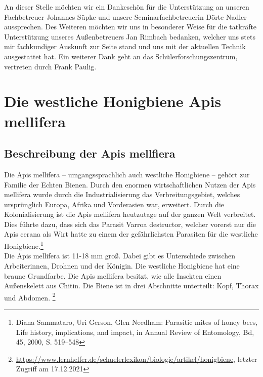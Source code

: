 \documentclass[11pt,a4paper]{article}
\begin{document}
An dieser Stelle möchten wir ein Dankeschön für die Unterstützung an unseren Fachbetreuer Johannes Süpke und unsere Seminarfachbetreuerin Dörte Nadler aussprechen. Des Weiteren möchten wir uns in besonderer Weise für die tatkräfte Unterstützung unseres Außenbetreuers Jan Rimbach bedanken, welcher uns stets mir fachkundiger Auskunft zur Seite stand und uns mit der aktuellen Technik ausgestattet hat. Ein weiterer Dank geht an das Schülerforschungszentrum, vertreten durch Frank Paulig. \\




\newpage
\section{Die westliche Honigbiene Apis mellifera} \label{section:Theory}

\subsection{Beschreibung der Apis mellfiera}
Die Apis mellifera – umgangssprachlich auch westliche Honigbiene – gehört zur Familie der Echten Bienen. Durch den enormen wirtschaftlichen Nutzen der Apis mellifera wurde durch die Industrialisierung das Verbreitungsgebiet, welches ursprünglich Europa, Afrika und Vorderasien war, erweitert. Durch die Kolonialisierung ist die Apis mellifera heutzutage auf der ganzen Welt verbreitet. Dies führte dazu, dass sich das Parasit Varroa destructor, welcher vorerst nur die Apis cerana als Wirt hatte zu einem der gefährlichsten Parasiten für die westliche Honigbiene.\footnote{Diana Sammataro, Uri Gerson, Glen Needham: Parasitic mites of honey bees, Life history, implications, and impact, in Annual Review of Entomology, Bd, 45, 2000, S. 519–548} \\
Die Apis mellifera ist 11-18 mm groß. Dabei gibt es Unterschiede zwischen Arbeiterinnen, Drohnen und der Königin. Die westliche Honigbiene hat eine braune Grundfarbe. Die Apis mellifera besitzt, wie alle Insekten einen Außenskelett aus Chitin. Die Biene ist in drei Abschnitte unterteilt: Kopf, Thorax und Abdomen. \footnote{\url{https://www.lernhelfer.de/schuelerlexikon/biologie/artikel/honigbiene}, letzter Zugriff am 17.12.2021}
\end{document}
